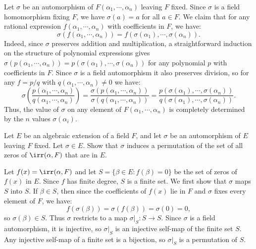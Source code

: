 \begin{solution}
  Let $\sigma$ be an automorphism of $F(\alpha_1, \cdots, \alpha_n)$ leaving $F$ fixed. Since $\sigma$ is a field homomorphism fixing $F$, we have $\sigma(a) = a$ for all $a \in F$. We claim that for any rational expression $f(\alpha_1, \cdots, \alpha_n)$ with coefficients in $F$, we have:
  \[%
    \sigma(f(\alpha_1, \cdots, \alpha_n)) = f(\sigma(\alpha_1), \cdots, \sigma(\alpha_n))
  .\]%
  Indeed, since $\sigma$ preserves addition and multiplication, a straightforward induction on the structure of polynomial expressions gives $\sigma(p(\alpha_1, \cdots, \alpha_n)) = p(\sigma(\alpha_1), \cdots, \sigma(\alpha_n))$ for any polynomial $p$ with coefficients in $F$. Since $\sigma$ is a field automorphism it also preserves division, so for any $f = p/q$ with $q(\alpha_1, \cdots, \alpha_n) \neq 0$ we have:
  \[%
    \sigma\!\left(\frac{p(\alpha_1, \cdots, \alpha_n)}{q(\alpha_1, \cdots, \alpha_n)}\right) = \frac{\sigma(p(\alpha_1, \cdots, \alpha_n))}{\sigma(q(\alpha_1, \cdots, \alpha_n))} = \frac{p(\sigma(\alpha_1), \cdots, \sigma(\alpha_n))}{q(\sigma(\alpha_1), \cdots, \sigma(\alpha_n))}
  .\]%
  Thus, the value of $\sigma$ on any element of $F(\alpha_1, \cdots, \alpha_n)$ is completely determined by the $n$ values $\sigma(\alpha_i)$.
\end{solution}

\begin{problem}[43.33]
  Let $E$ be an algebraic extension of a field $F$, and let $\sigma$ be an automorphism of $E$ leaving $F$ fixed. Let $\sigma \in E$. Show that $\sigma$ induces a permutation of the set of all zeros of $\irr(\alpha, F)$ that are in $E$.
\end{problem}

\begin{solution}
  Let $f(x) = \irr(\alpha, F)$ and let $S = \{\beta \in E : f(\beta) = 0\}$ be the set of zeros of $f(x)$ in $E$. Since $f$ has finite degree, $S$ is a finite set. We first show that $\sigma$ maps $S$ into $S$. If $\beta \in S$, then since the coefficients of $f(x)$ lie in $F$ and $\sigma$ fixes every element of $F$, we have:
  \[%
    f(\sigma(\beta)) = \sigma(f(\beta)) = \sigma(0) = 0
  ,\]%
  so $\sigma(\beta) \in S$. Thus $\sigma$ restricts to a map $\sigma|_S : S \to S$. Since $\sigma$ is a field automorphism, it is injective, so $\sigma|_S$ is an injective self-map of the finite set $S$. Any injective self-map of a finite set is a bijection, so $\sigma|_S$ is a permutation of $S$.
\end{solution}

